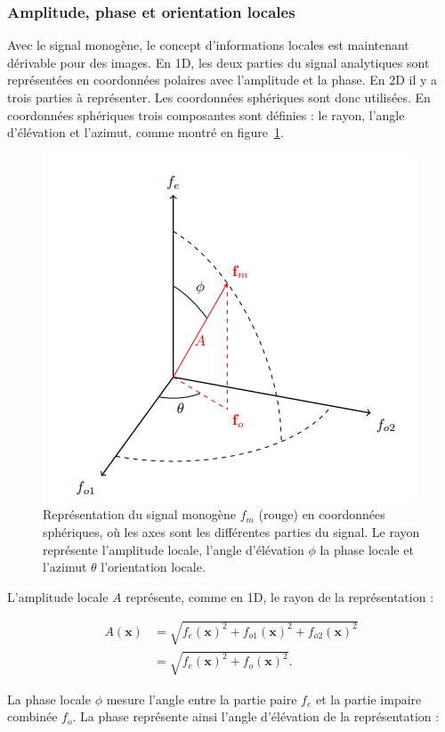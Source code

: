 \subsubsection{Amplitude, phase et orientation locales}

Avec le signal monogène, le concept d'informations locales est maintenant dérivable pour des images. En 1D, les deux parties du signal analytiques sont représentées en coordonnées polaires avec l'amplitude et la phase. En 2D il y a trois parties à représenter. Les coordonnées sphériques sont donc utilisées. En coordonnées sphériques trois composantes sont définies : le rayon, l'angle d'élévation et l'azimut, comme montré en figure~\ref{fig:spherical-representation}.

\bigskip

\begin{figure}
    \centering
    \includegraphics[width=.45\textwidth]{contenu/resources/images/spherical_representation}
    \caption[Représentation du signal monogène en coordonnées sphériques]{Représentation du signal monogène $f_m$ (rouge) en coordonnées sphériques, où les axes sont les différentes parties du signal. Le rayon représente l'amplitude locale, l'angle d'élévation $\phi$ la phase locale et l'azimut $\theta$ l'orientation locale.}
    \label{fig:spherical-representation}
\end{figure}

L'amplitude locale $A$ représente, comme en 1D, le rayon de la représentation :

\begin{align}
    A(\mathbf{x}) &= \sqrt{f_e(\mathbf{x})^2 + f_{o1}(\mathbf{x})^2 + f_{o2}(\mathbf{x})^2} \\
    &= \sqrt{f_e(\mathbf{x})^2 + f_o(\mathbf{x})^2}.
\end{align}

La phase locale $\phi$ mesure l'angle entre la partie paire $f_e$ et la partie impaire combinée $f_o$. La phase représente ainsi l'angle d'élévation de la représentation :


